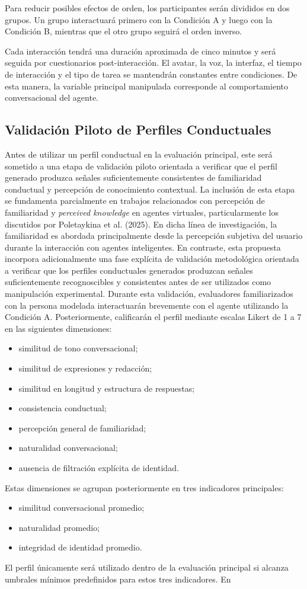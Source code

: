 \documentclass[12pt]{article}
\begin{document}
Para reducir posibles efectos de orden, los participantes serán divididos en dos grupos. Un grupo interactuará primero con la Condición A y luego con la Condición B, mientras que el otro grupo seguirá el orden inverso.

Cada interacción tendrá una duración aproximada de cinco minutos y será seguida por cuestionarios post-interacción. El avatar, la voz, la interfaz, el tiempo de interacción y el tipo de tarea se mantendrán constantes entre condiciones. De esta manera, la variable principal manipulada corresponde al comportamiento conversacional del agente.


\subsection{Validación Piloto de Perfiles Conductuales} Antes de utilizar un perfil conductual en la evaluación principal, este será sometido a una etapa de validación piloto orientada a verificar que el perfil generado produzca señales suficientemente consistentes de familiaridad conductual y percepción de conocimiento contextual. La inclusión de esta etapa se fundamenta parcialmente en trabajos relacionados con percepción de familiaridad y \textit{perceived knowledge} en agentes virtuales, particularmente los discutidos por Poletaykina et al. (2025). En dicha línea de investigación, la familiaridad es abordada principalmente desde la percepción subjetiva del usuario durante la interacción con agentes inteligentes. En contraste, esta propuesta incorpora adicionalmente una fase explícita de validación metodológica orientada a verificar que los perfiles conductuales generados produzcan señales suficientemente recognoscibles y consistentes antes de ser utilizados como manipulación experimental. Durante esta validación, evaluadores familiarizados con la persona modelada interactuarán brevemente con el agente utilizando la Condición A. Posteriormente, calificarán el perfil mediante escalas Likert de 1 a 7 en las siguientes dimensiones: \begin{itemize} \item similitud de tono conversacional; \item similitud de expresiones y redacción; \item similitud en longitud y estructura de respuestas; \item consistencia conductual; \item percepción general de familiaridad; \item naturalidad conversacional; \item ausencia de filtración explícita de identidad. \end{itemize} Estas dimensiones se agrupan posteriormente en tres indicadores principales: \begin{itemize} \item similitud conversacional promedio; \item naturalidad promedio; \item integridad de identidad promedio. \end{itemize} El perfil únicamente será utilizado dentro de la evaluación principal si alcanza umbrales mínimos predefinidos para estos tres indicadores. En 
\end{document}
